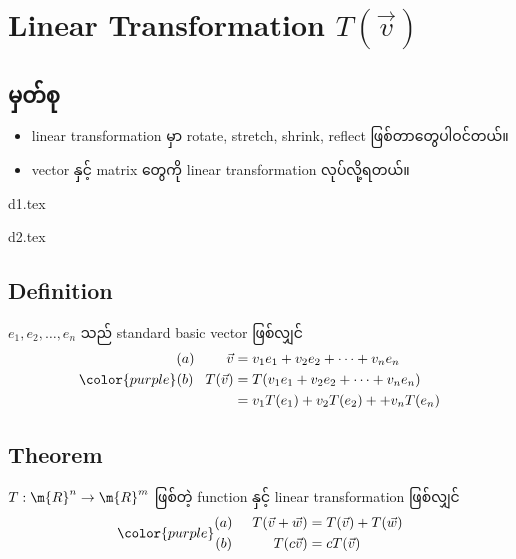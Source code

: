 \section{Linear Transformation $T(\vec{v})$}
\subsection{မှတ်စု}
\begin{itemize}
    \item linear transformation မှာ rotate, stretch, shrink, reflect ဖြစ်တာတွေပါဝင်တယ်။
    \item vector နှင့် matrix တွေကို linear transformation လုပ်လို့ရတယ်။
\end{itemize}
\begin{minipage}{0.45\textwidth}
    \centering
    {d1.tex}
\end{minipage}
\hfill
\begin{minipage}{0.45\textwidth}
    \centering
    {d2.tex}
\end{minipage}
\subsection{Definition}
$e_1,e_2,\dots,e_n$ သည် standard basic vector ဖြစ်လျှင် 
\begin{equation}
    {\color{purple} \begin{split}
        (a)\hspace{8mm} \vec{v}&=v_1e_1+v_2e_2+\dots+v_ne_n \\
        (b)\hspace{3mm} T(\vec{v})&=T(v_1e_1+v_2e_2+\dots+v_ne_n) \\
        &=v_1T(e_1)+v_2T(e_2)++v_nT(e_n)
    \end{split}}
\end{equation}
\subsection{Theorem}
$T:\m{R}^n\rightarrow\m{R}^m$ ဖြစ်တဲ့ function နှင့် linear transformation ဖြစ်လျှင်
\begin{equation}
    {\color{purple} \begin{split}
        (a)\hspace{5mm}T(\vec{v}+\vec{w})&=T(\vec{v})+T(\vec{w}) \\
        (b)\hspace{10.5mm}T(c\vec{v})&=cT(\vec{v})
    \end{split}}
    \label{eq:linear-transformation}
\end{equation}
